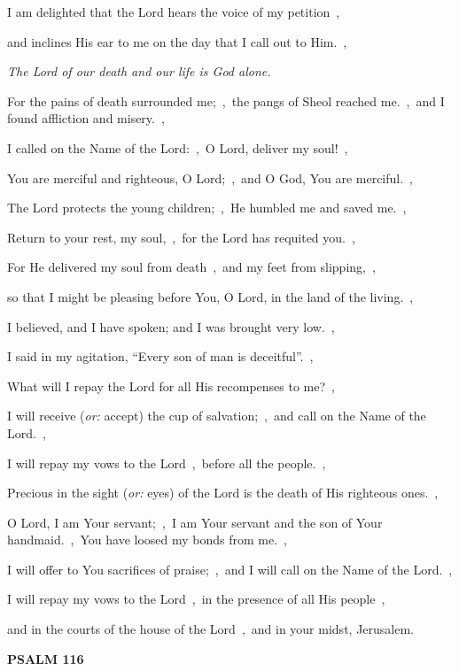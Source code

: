 \documentclass[12pt,twoside,a5paper]{article}
\newcommand{\psalm}[1]{\textbf{PSALM {#1}}\nopagebreak}
\newcommand{\qanona}[1]{{\liturgicalhint{Qanona.} \emph{#1}}}
\newcommand{\translationoption}[1]{\emph{or:} #1}
\begin{document}
\begin{normalparskip}
  I am delighted that the Lord hears the voice of my petition~\sep

  and inclines His ear to me on the day that I call out to Him.~\sep

  \qanona{The Lord of our death and our life is God alone.}

  For the pains of death surrounded me;~\sep\ the pangs of Sheol reached me.~\sep\ and I found affliction and misery.~\sep

  I called on the Name of the Lord:~\sep\ O Lord, deliver my soul!~\sep

  You are merciful and righteous, O Lord;~\sep\ and O God, You are merciful.~\sep

  The Lord protects the young children;~\sep\ He humbled me and saved me.~\sep

  Return to your rest, my soul,~\sep\ for the Lord has requited you.~\sep

  For He delivered my soul from death~\sep\ and my feet from slipping,~\sep

  so that I might be pleasing before You, O Lord, in the land of the living.~\sep

  I believed, and I have spoken; and I was brought very low.~\sep

  I said in my agitation, ``Every son of man is deceitful''.~\sep

  What will I repay the Lord for all His recompenses to me?~\sep

  I will receive (\translationoption{accept}) the cup of salvation;~\sep\ and call on the Name of the Lord.~\sep

  I will repay my vows to the Lord~\sep\ before all the people.~\sep

  Precious in the sight (\translationoption{eyes}) of the Lord is the death of His righteous ones.~\sep

  O Lord, I am Your servant;~\sep\ I am Your servant and the son of Your handmaid.~\sep\ You have loosed my bonds from me.~\sep

  I will offer to You sacrifices of praise;~\sep\ and I will call on the Name of the Lord.~\sep

  I will repay my vows to the Lord~\sep\ in the presence of all His people~\sep

  and in the courts of the house of the Lord~\sep\ and in your midst, Jerusalem.
\end{normalparskip}

\psalm{116}
\end{document}
